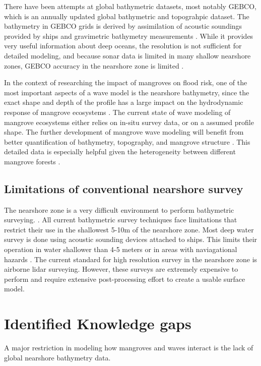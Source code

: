 There have been attempts at global bathymetric datasets, most notably GEBCO, which is an annually updated global bathymetric and topograhpic dataset. The bathymetry in GEBCO grids is derived by assimilation of acoustic soundings provided by ships and gravimetric bathymetry measurements \parencite{Cesbron2021}. While it provides very useful information about deep oceans, the resolution is not sufficient for detailed modeling, and because sonar data is limited in many shallow nearshore zones, GEBCO accuracy in the nearshore zone is limited \parencite{add}.

In the context of researching the impact of mangroves on flood risk, one of the most important aspects of a wave model is the nearshore bathymetry, since the exact shape and depth of the profile has a large impact on the hydrodynamic response of mangrove ecosystems \parencite{Horstman2014,Maza2019}. The current state of wave modeling of mangrove ecosystems either relies on in-situ survey data, or on a assumed profile shape. The further development of mangrove wave modeling will benefit from better quantification of bathymetry, topography, and mangrove structure \parencite{Menendez2020}. This detailed data is especially helpful given the heterogeneity between different mangrove forests \parencite{Mazda2013}.

\subsection{Limitations of conventional nearshore survey}

The nearshore zone is a very difficult environment to perform bathymetric surveying. \parencite{Parrish2019}. All current bathymetric survey techniques face limitations that restrict their use in the shallowest 5-10m of the nearshore zone. Most deep water survey is done using acoustic sounding devices attached to ships. This limits their operation in water shallower than 4-5 meters or in areas with naviagational hazards \parencite{Cesbron2021,add}. The current standard for high resolution survey in the nearshore zone is airborne lidar surveying. However, these surveys are extremely expensive to perform and require extensive post-processing effort to create a usable surface model.

\section{Identified Knowledge gaps}
A major restriction in modeling how mangroves and waves interact is the lack of global nearshore bathymetry data.  
